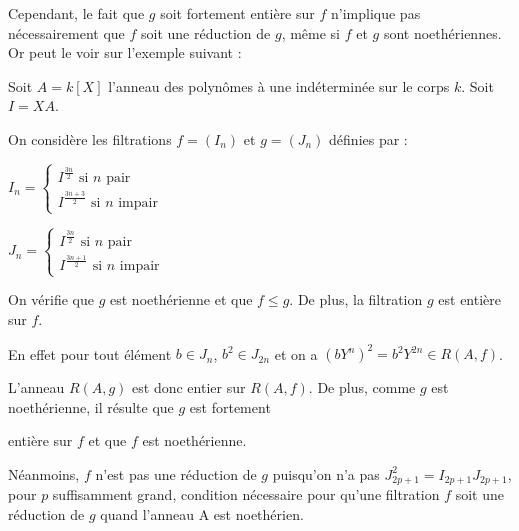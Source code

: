 \begin{maremarque}
	Cependant, le fait que $g$ soit fortement entière sur $f$ n'implique pas
	nécessairement que $f$ soit une réduction de $g$, m\^{e}me si $f$ et 
	$g$ sont noethériennes. Or peut le voir sur l'exemple suivant : 
	
	Soit $A=k[X]$ l'anneau des polynômes à une indéterminée sur le
	corps $k$. Soit $I=XA$. 
	
	On considère les filtrations $f=(I_{n})$ et $g=(J_{n})$ définies par
	:
	
	$I_{n}=\left\{ 
	\begin{array}{c}
		I^{\frac{3n}{2}}\text{ si }n\text{ pair} \\ 
		I^{\frac{3n+3}{2}}\text{ si }n\text{ impair}%
	\end{array}%
	\right. $
	
	$J_{n}=\left\{ 
	\begin{array}{c}
		I^{\frac{3n}{2}}\text{ si }n\text{ pair} \\ 
		I^{\frac{3n+1}{2}}\text{ si }n\text{ impair}
	\end{array}
	\right. $
	
	On vérifie que $g$ est noethérienne et que $f\leq g$. De plus, la
	filtration $g$ est entière sur $f$. 
	
	En effet pour tout élément $b\in J_{n}$, $b^{2}\in J_{2n}$ et on a $(bY^{n})^{2}=b^{2}Y^{2n}\in R(A,f)$. 
	
	L'anneau $R(A,g)$ est donc entier sur $R(A,f)$. De plus, comme $g$ est noethérienne, il résulte que $g$ est fortement
	
	entière sur $f$ et que $f$ est noethérienne. 
	
	Néanmoins, $f$ n'est pas une réduction de $g$ puisqu'on n'a pas $J_{2p+1}^{2}=I_{2p+1}J_{2p+1}$, pour $p$ suffisamment grand, condition nécessaire pour qu'une filtration $f$ soit une réduction de $g$ quand
	l'anneau A est noethérien. 
\end{maremarque}
